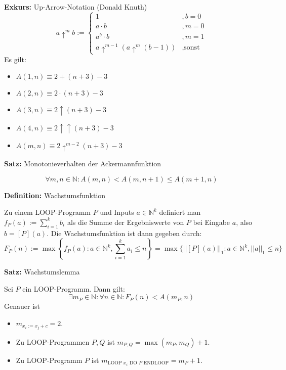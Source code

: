 \documentclass[a4paper,graphics,11pt]{article}
\begin{document}
\strut

\textbf{Exkurs:} Up-Arrow-Notation (Donald Knuth)
$$
    a \uparrow^m b :=
    \begin{cases}
        1               &, b = 0\\
        a \cdot b       &, m = 0\\
        a^b \cdot b     &, m = 1\\
        a \uparrow^{m-1}(a \uparrow^m(b-1)) &, \text{sonst}
    \end{cases}
$$
Es gilt:
\begin{itemize}
    \item $A(1,n) \equiv 2 + (n+3) - 3$
    \item $A(2,n) \equiv 2 \cdot (n+3) - 3$
    \item $A(3,n) \equiv 2 \uparrow (n+3) - 3$
    \item $A(4,n) \equiv 2 \uparrow\uparrow (n+3) - 3$
    \item $A(m,n) \equiv 2 \uparrow^{m-2} (n+3) - 3$
\end{itemize}

\newpage

\textbf{Satz:} Monotonieverhalten der Ackermannfunktion

$$
    \forall m,n \in \mathbb{N}: A(m,n) < A(m,n+1) \leq A(m+1,n)
$$

\strut

\textbf{Definition:} Wachstumsfunktion

Zu einem LOOP-Programm $P$ und Inputs $a \in \mathbb{N}^k$ definiert man
$
    f_P(a) := \sum_{i=1}^{k} b_i
$
als die Summe der Ergebniswerte von $P$ bei Eingabe $a$, also $b = [P](a)$.
Die Wachstumsfunktion ist dann gegeben durch:
$$
    F_P(n) := \max\left\{f_P(a) : a \in \mathbb{N}^k, \sum_{i=1}^{k} a_i \leq n\right\}
    = \max\{||[P](a)||_1 : a \in \mathbb{N}^k, ||a||_1 \leq n\}
$$

\strut

\textbf{Satz:} Wachstumslemma

Sei $P$ ein LOOP-Programm. Dann gilt:
$$
    \exists m_P \in \mathbb{N} : \forall n \in \mathbb{N} : F_P(n) < A(m_P,n)
$$
Genauer ist
\begin{itemize}
    \item $m_{x_i := x_j + c} = 2$.
    \item Zu LOOP-Programmen $P,Q$ ist $m_{P;Q} = \max(m_P,m_Q)+1$.
    \item Zu LOOP-Programm $P$ ist $m_{\text{LOOP } x_i \text{ DO } P \text{ ENDLOOP}} = m_P + 1$.
\end{itemize}
\end{document}
